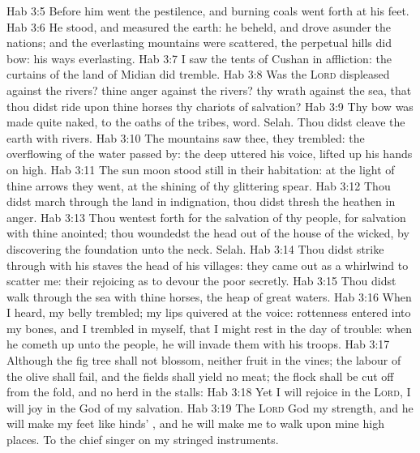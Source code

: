 \vs Hab 3:5 Before him went the pestilence, and burning coals went forth at his feet.
\vs Hab 3:6 He stood, and measured the earth: he beheld, and drove asunder the nations; and the everlasting mountains were scattered, the perpetual hills did bow: his ways  everlasting.
\vs Hab 3:7 I saw the tents of Cushan in affliction:  the curtains of the land of Midian did tremble.
\vs Hab 3:8 Was the \textsc{Lord} displeased against the rivers?  thine anger against the rivers?  thy wrath against the sea, that thou didst ride upon thine horses  thy chariots of salvation?
\vs Hab 3:9 Thy bow was made quite naked,  to the oaths of the tribes,  word. Selah. Thou didst cleave the earth with rivers.
\vs Hab 3:10 The mountains saw thee,  they trembled: the overflowing of the water passed by: the deep uttered his voice,  lifted up his hands on high.
\vs Hab 3:11 The sun  moon stood still in their habitation: at the light of thine arrows they went,  at the shining of thy glittering spear.
\vs Hab 3:12 Thou didst march through the land in indignation, thou didst thresh the heathen in anger.
\vs Hab 3:13 Thou wentest forth for the salvation of thy people,  for salvation with thine anointed; thou woundedst the head out of the house of the wicked, by discovering the foundation unto the neck. Selah.
\vs Hab 3:14 Thou didst strike through with his staves the head of his villages: they came out as a whirlwind to scatter me: their rejoicing  as to devour the poor secretly.
\vs Hab 3:15 Thou didst walk through the sea with thine horses,  the heap of great waters.
\vs Hab 3:16 When I heard, my belly trembled; my lips quivered at the voice: rottenness entered into my bones, and I trembled in myself, that I might rest in the day of trouble: when he cometh up unto the people, he will invade them with his troops.
\vs Hab 3:17 Although the fig tree shall not blossom, neither  fruit  in the vines; the labour of the olive shall fail, and the fields shall yield no meat; the flock shall be cut off from the fold, and  no herd in the stalls:
\vs Hab 3:18 Yet I will rejoice in the \textsc{Lord}, I will joy in the God of my salvation.
\vs Hab 3:19 The \textsc{Lord} God  my strength, and he will make my feet like hinds' , and he will make me to walk upon mine high places. To the chief singer on my stringed instruments.
